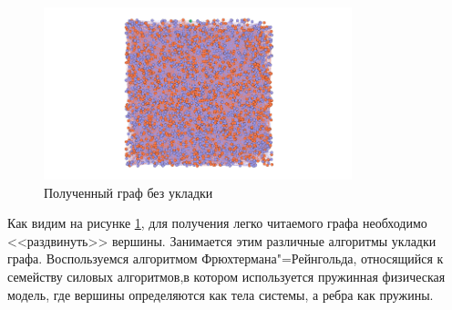 \begin{figure}[H]
    \centering
    \includegraphics[height = 5cm]{pictures/Graph_without_layout.png}
    \caption{Полученный граф без укладки}
    \label{fig:graph_without_layout}
\end{figure}
Как видим на рисунке \ref{fig:graph_without_layout}, для получения легко читаемого графа необходимо <<раздвинуть>> вершины. Занимается этим различные алгоритмы укладки графа. Воспользуемся алгоритмом Фрюхтермана"=Рейнгольда, относящийся к семейству силовых алгоритмов,в котором используется пружинная физическая модель, где вершины определяются как тела системы, а ребра как пружины.

